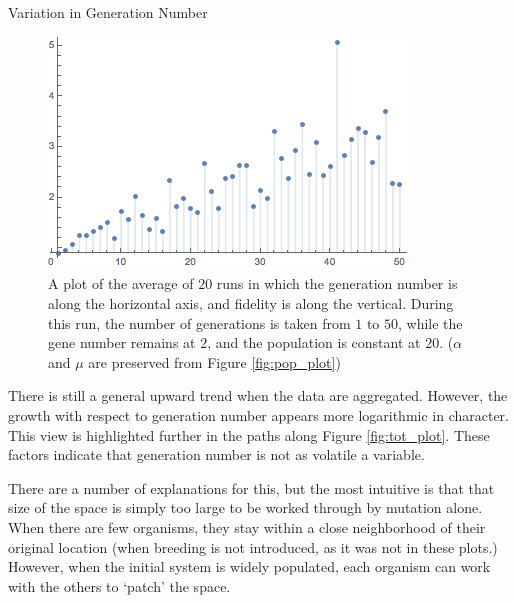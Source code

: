 \documentclass[14pt]{beamer}
\renewcommand{\maketitle}{%
	\begin{center}%
		\Huge\inserttitle\\[5mm]%
		\Large\insertauthor\\[5mm]%
		\Large\insertinstitute%
	\end{center}%
	\vspace*{-1.5ex}%
}
\begin{document}
\begin{frame}{\maketitle}
\begin{columns}
\begin{column}{.45\textwidth}
\begin{exampleblock}{Variation in Generation Number}
	\begin{figure}[htpb]
		\centering
			\includegraphics[scale=1.3]{g2.png}
		\centering
		\caption{A plot of the average of $20$ runs in which the generation number is along the horizontal axis, and fidelity is along the vertical. During this run, the number of generations is taken from $1$ to $50$, while the gene number remains at $2$, and the population is constant at $20$. ($\alpha$ and $\mu$ are preserved from Figure \ref{fig:pop_plot})}
		\label{fig:gen_plot}
	\end{figure}

	There is still a general upward trend when the data are aggregated. However, the growth with respect to generation number appears more logarithmic in character. This view is highlighted further in the paths along Figure \ref{fig:tot_plot}. These factors indicate that generation number is not as volatile a variable. 

	There are a number of explanations for this, but the most intuitive is that that size of the space is simply too large to be worked through by mutation alone. When there are few organisms, they stay within a close neighborhood of their original location (when breeding is not introduced, as it was not in these plots.) However, when the initial system is widely populated, each organism can work with the others to `patch' the space. 
\end{exampleblock}				\vspace{1em}


\end{column}
\end{columns}
\end{frame}
\end{document}
